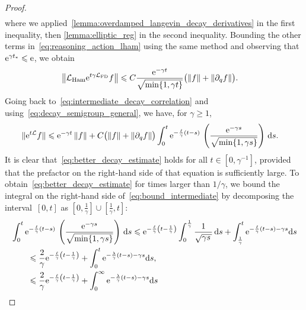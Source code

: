 \documentclass[11pt,a4paper]{article}
\begin{document}
\begin{proof}
\begin{align*}
    \end{align*}
    where we applied~\eqref{lemma:overdamped_langevin_decay_derivatives} in the first inequality,
    then \eqref{lemma:elliptic_reg} in the second inequality.
    Bounding the other terms in~\eqref{eq:reasoning_action_lham} using the same method
    and observing that~$\mathrm{e}^{\gamma t_*} \leqslant \mathrm{e}$,
    we obtain
    \begin{align}
        \label{eq:bound_action_lham}
        \norm{\mathcal L_{\rm Ham} \e^{t \gamma \mathcal L_{\rm FD}} f}
        &\leq C  \frac{\e^{-\gamma t}}{\sqrt{\min\{1, \gamma t\}}}  \bigl( \norm{f} + \norm{\partial_q f} \bigr).
    \end{align}
    Going back to~\eqref{eq:intermediate_decay_correlation} and using~\eqref{eq:decay_semigroup_general},
    we have, for $\gamma \geq 1$,
    \begin{align}
        \label{eq:bound_intermediate}
        \norm*{ \e^{t \mathcal L} f}
        &\leq  \e^{-\gamma t} \norm{f}
        + C  \bigl( \norm{f} + \norm{\partial_q f}\bigr) \int_{0}^{t} \e^{-\frac{\ell}{\gamma}(t-s)}  \, \left(\frac{\e^{-\gamma s}}{\sqrt{\min\{1, \gamma s\}}}\right) \, \d s.
    \end{align}
    It is clear that~\eqref{eq:better_decay_estimate} holds for all $t \in [0, \gamma^{-1}]$,
    provided that the prefactor on the right-hand side of that equation is sufficiently large.
    To obtain~\eqref{eq:better_decay_estimate} for times larger than $1/\gamma$,
    we bound the integral on the right-hand side of~\eqref{eq:bound_intermediate} by decomposing the interval~$[0, t]$ as $[0, \frac{1}{\gamma}] \cup [\frac{1}{\gamma}, t]$:
    \begin{align}
        \notag
        &\int_{0}^{t} \e^{-\frac{\ell}{\gamma}(t-s)}  \, \left( \frac{\e^{-\gamma s}}{\sqrt{\min\{1, \gamma s\}}} \right) \, \d s
        \leq
        \e^{-\frac{\ell}{\gamma} \left(t-\frac{1}{\gamma}\right)}
         \int_{0}^{\frac{1}{\gamma}}  \frac{1}{\sqrt{\gamma s\, }} \, \d s
         + \int_{\frac{1}{\gamma}}^{t} \e^{-\frac{\ell}{\gamma}(t-s) - \gamma s} \d s \\
         \notag
        &\qquad \leq
        \frac{2}{\gamma}\e^{-\frac{\ell}{\gamma} \left(t-\frac{1}{\gamma}\right)}
         + \int_{0}^{t} \e^{-\frac{\lambda}{\gamma}(t-s) - \gamma s} \d s, \\
         \label{eq:bound_integral}
        &\qquad \leq
        \frac{2}{\gamma}\e^{-\frac{\ell}{\gamma} \left(t-\frac{1}{\gamma}\right)}
         + \int_{0}^{\infty} \e^{-\frac{\lambda}{\gamma}(t-s) - \gamma s} \d s

\end{align}
\end{proof}
\end{document}
